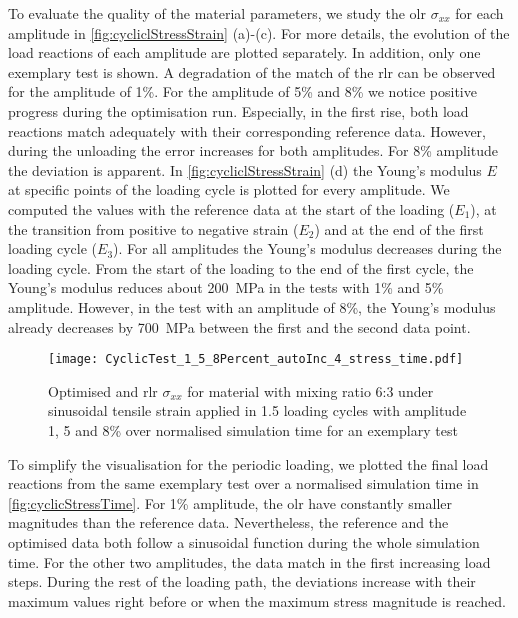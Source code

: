 To evaluate the quality of the material parameters, we study the \acrlong{olr} $\sigma_{xx}$ for each amplitude in \autoref{fig:cycliclStressStrain} (a)-(c). For more details, the evolution of the load reactions of each amplitude are plotted separately. In addition, only one exemplary test is shown. A degradation of the match of the \acrlong{rlr} can be observed for the amplitude of 1\%.
For the amplitude of 5\% and 8\% we notice positive progress during the optimisation run. Especially, in the first rise, both load reactions match adequately with their corresponding reference data. However, during the unloading the error increases for both amplitudes. For 8\% amplitude the deviation is apparent. In \autoref{fig:cycliclStressStrain} (d) the Young's modulus $E$ at specific points of the loading cycle is plotted for every amplitude. We computed the values with the reference data at the start of the loading ($E_1$), at the transition from positive to negative strain ($E_2$) and at the end of the first loading cycle ($E_3$). For all amplitudes the Young's modulus decreases during the loading cycle. From the start of the loading to the end of the first cycle, the Young's modulus reduces about 200 MPa in the tests with 1\% and 5\% amplitude. However, in the test with an amplitude of 8\%, the Young's modulus already decreases by 700 MPa between the first and the second data point. 


\begin{figure}[H]
    \centering
    \texttt{[image: CyclicTest\_1\_5\_8Percent\_autoInc\_4\_stress\_time.pdf]}
    \caption{Optimised and \acrfull{rlr} $\sigma_{xx}$ for material with mixing ratio 6:3 under sinusoidal tensile strain applied in 1.5 loading cycles with amplitude 1, 5 and 8\% over normalised simulation time for an exemplary test}
    \label{fig:cyclicStressTime}
\end{figure}

To simplify the visualisation for the periodic loading, we plotted the final load reactions from the same exemplary test over a normalised simulation time in \autoref{fig:cyclicStressTime}. For 1\% amplitude, the \acrlong{olr} have constantly smaller magnitudes than the reference data.
Nevertheless, the reference and the optimised data both follow a sinusoidal function during the whole simulation time.  For the other two amplitudes, the data match in the first increasing load steps. During the rest of the loading path, the deviations increase with their maximum values right before or when the maximum stress magnitude is reached. 

